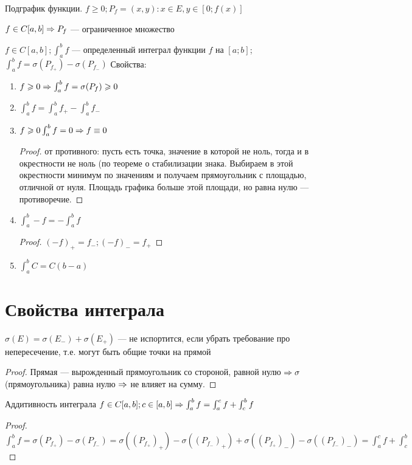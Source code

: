\begin{Def}
Подграфик функции. $ f \geqslant 0; P_f = {(x, y): x \in E, y \in [0; f(x)]} $
\end{Def}

\begin{Rem}
$f \in C[a, b] \Rightarrow P_f $ --- ограниченное множество
\end{Rem}

\begin{Def}
$f \in C[a, b]; \int_a^b f$ --- определенный интеграл функции $ f$ на $[a; b]$; $\int_a^b f = \sigma (P_{f_+}) - \sigma (P_{f_-}) $
Свойства:
\begin{enumerate}
\item $f \geqslant 0 \Rightarrow \int_a^b f = \sigma(P_f) \geqslant 0$
\item $\int_a^b f  = \int_a^b f_+ - \int_a^b f_- $
\item $f \geqslant 0 \int_a^b f = 0 \Rightarrow f \equiv 0$
\begin{proof}
от противного: пусть есть точка, значение в которой не ноль, тогда и в окрестности не ноль (по теореме о стабилизации знака.
Выбираем в этой окрестности минимум по значениям и получаем прямоугольник с площадью, отличной от нуля.
Площадь графика больше этой площади, но равна нулю --- противоречие.
\end{proof} 
\item $\int_a^b -f = - \int_a^b f$
\begin{proof}
$(-f)_+ = f_- ; (-f)_- = f_+ $
\end{proof} 
\item $\int_a^b C = C(b - a)$
\end{enumerate}
\end{Def}

\section{Свойства интеграла}

\begin{Rem}
$ \sigma (E) = \sigma (E_-) + \sigma (E_+) $ --- не испортится, если убрать требование про непересечение, т.е. могут быть общие точки на прямой
\end{Rem}
\begin{proof}
Прямая --- вырожденный прямоугольник со стороной, равной нулю $ \Rightarrow \sigma $ (прямоугольника) равна нулю $ \Rightarrow $ не влияет на сумму.
\end{proof}

\begin{theorem}{Аддитивность интеграла}
$f \in C[a, b]; c \in [a, b] \Rightarrow \int_a^b f = \int_a^c f + \int_c^b f$
\end{theorem}
\begin{proof}
$ \int_a^b f = \sigma (P_{f_+}) - \sigma (P_{f_-}) = \sigma ((P_{f_+})_+) - \sigma ((P_{f_-})_+) + \sigma ((P_{f_+})_-) - \sigma ((P_{f_-})_-) = \int_a^c f + \int_c^b $
\end{proof}

